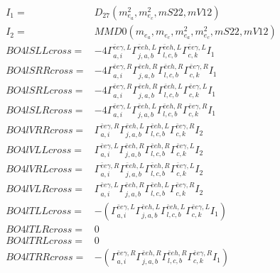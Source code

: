 \documentclass[A4,landscape]{article}
\begin{document}
\begin{align} 
I_1 = & D_{27}(m^2_{e_{{a}}}, m^2_{e_{{c}}}, mS22, mV12) \\ 
I_2 = & MMD0(m_{e_{{a}}}, m_{e_{{c}}}, m^2_{e_{{a}}}, m^2_{e_{{c}}}, mS22, mV12) \\ 
  BO4lSLLcross= & -4  \Gamma^{\bar{e}e \gamma ,L}_{a, i} \Gamma^{\bar{e}e h ,L}_{j, a, b} \Gamma^{\bar{e}e h ,L}_{l, c, b} \Gamma^{\bar{e}e \gamma ,L}_{c, k} I_1 \\ 
  BO4lSRRcross= & -4  \Gamma^{\bar{e}e \gamma ,R}_{a, i} \Gamma^{\bar{e}e h ,R}_{j, a, b} \Gamma^{\bar{e}e h ,R}_{l, c, b} \Gamma^{\bar{e}e \gamma ,R}_{c, k} I_1 \\ 
  BO4lSRLcross= & -4  \Gamma^{\bar{e}e \gamma ,R}_{a, i} \Gamma^{\bar{e}e h ,R}_{j, a, b} \Gamma^{\bar{e}e h ,L}_{l, c, b} \Gamma^{\bar{e}e \gamma ,L}_{c, k} I_1 \\ 
  BO4lSLRcross= & -4  \Gamma^{\bar{e}e \gamma ,L}_{a, i} \Gamma^{\bar{e}e h ,L}_{j, a, b} \Gamma^{\bar{e}e h ,R}_{l, c, b} \Gamma^{\bar{e}e \gamma ,R}_{c, k} I_1 \\ 
  BO4lVRRcross= &  \Gamma^{\bar{e}e \gamma ,R}_{a, i} \Gamma^{\bar{e}e h ,L}_{j, a, b} \Gamma^{\bar{e}e h ,L}_{l, c, b} \Gamma^{\bar{e}e \gamma ,R}_{c, k} I_2 \\ 
  BO4lVLLcross= &  \Gamma^{\bar{e}e \gamma ,L}_{a, i} \Gamma^{\bar{e}e h ,R}_{j, a, b} \Gamma^{\bar{e}e h ,R}_{l, c, b} \Gamma^{\bar{e}e \gamma ,L}_{c, k} I_2 \\ 
  BO4lVRLcross= &  \Gamma^{\bar{e}e \gamma ,R}_{a, i} \Gamma^{\bar{e}e h ,L}_{j, a, b} \Gamma^{\bar{e}e h ,R}_{l, c, b} \Gamma^{\bar{e}e \gamma ,L}_{c, k} I_2 \\ 
  BO4lVLRcross= &  \Gamma^{\bar{e}e \gamma ,L}_{a, i} \Gamma^{\bar{e}e h ,R}_{j, a, b} \Gamma^{\bar{e}e h ,L}_{l, c, b} \Gamma^{\bar{e}e \gamma ,R}_{c, k} I_2 \\ 
  BO4lTLLcross= & -( \Gamma^{\bar{e}e \gamma ,L}_{a, i} \Gamma^{\bar{e}e h ,L}_{j, a, b} \Gamma^{\bar{e}e h ,L}_{l, c, b} \Gamma^{\bar{e}e \gamma ,L}_{c, k} I_1) \\ 
  BO4lTLRcross= & 0 \\ 
  BO4lTRLcross= & 0 \\ 
  BO4lTRRcross= & -( \Gamma^{\bar{e}e \gamma ,R}_{a, i} \Gamma^{\bar{e}e h ,R}_{j, a, b} \Gamma^{\bar{e}e h ,R}_{l, c, b} \Gamma^{\bar{e}e \gamma ,R}_{c, k} I_1) \\ 
\end{align} 
\end{document}
